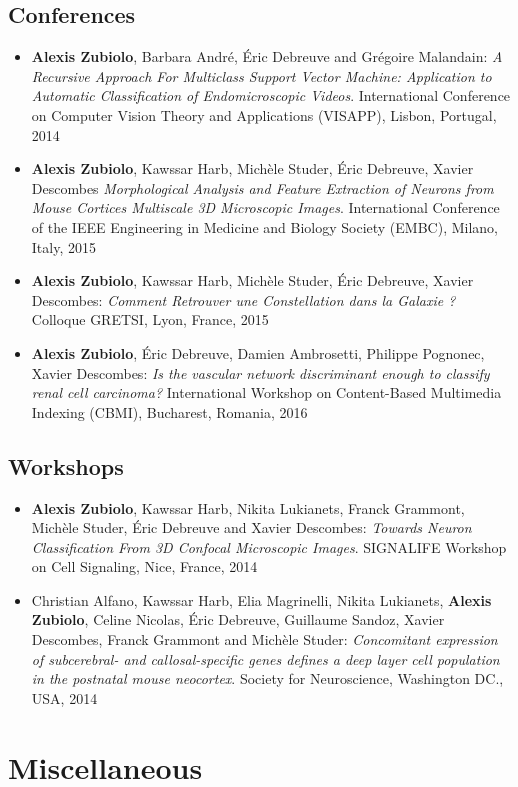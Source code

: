 \documentclass[11pt,a4paper,sans]{moderncv}   %
\begin{document}
\subsection{Conferences}
\begin{itemize}
\item \textbf{Alexis Zubiolo}, Barbara André, \'Eric Debreuve and Grégoire Malandain:
\textit{A Recursive Approach For Multiclass Support Vector Machine: Application to Automatic Classification of Endomicroscopic Videos}. 
International Conference on Computer Vision Theory and Applications (VISAPP), Lisbon, Portugal, 2014
\item \textbf{Alexis Zubiolo}, Kawssar Harb, Mich\`ele Studer, \'Eric Debreuve, Xavier Descombes
\textit{Morphological Analysis and Feature Extraction of Neurons from Mouse Cortices Multiscale 3D Microscopic Images}.
International Conference of the IEEE Engineering in Medicine and Biology Society (EMBC), Milano, Italy, 2015
\item \textbf{Alexis Zubiolo}, Kawssar Harb, Mich\`ele Studer, \'Eric Debreuve, Xavier Descombes: \textit{Comment Retrouver une Constellation dans la Galaxie ?}
Colloque GRETSI, Lyon, France, 2015
\item \textbf{Alexis Zubiolo}, \'Eric Debreuve, Damien Ambrosetti, Philippe Pognonec, Xavier Descombes: \textit{Is the vascular network discriminant enough to classify renal cell carcinoma?}
International Workshop on Content-Based Multimedia Indexing (CBMI), Bucharest, Romania, 2016

\end{itemize}

\subsection{Workshops}
\begin{itemize}

\item \textbf{Alexis Zubiolo}, Kawssar Harb, Nikita Lukianets, Franck Grammont, Michèle Studer, Éric Debreuve and Xavier Descombes: \textit{Towards Neuron Classification From 3D Confocal Microscopic Images}.
SIGNALIFE Workshop on Cell Signaling, Nice, France, 2014

\item Christian Alfano, Kawssar Harb, Elia Magrinelli, Nikita Lukianets, \textbf{Alexis Zubiolo}, Celine Nicolas, \'Eric Debreuve, Guillaume Sandoz, Xavier Descombes, Franck Grammont and Mich\`ele Studer: \textit{Concomitant expression of subcerebral- and callosal-specific genes defines a deep layer cell population in the postnatal mouse neocortex}.
Society for Neuroscience, Washington DC., USA, 2014
\end{itemize}

\section{Miscellaneous}
\end{document}
